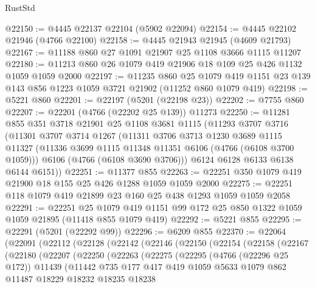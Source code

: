 \begin{lexlean}{RustStd}
\begin{coremodule}
{\begin{coremodule}
{{{{{{{{{{{{{{{{{{{{{{{{{{{{{{{{{{{@22150 := @4445 @22137 @22104 (@5902 @22094)
@22154 := @4445 @22102 @21946 (@4766 @22100)
@22158 := @4445 @21943 @21945 (@4609 @21793)
@22167 := @11188 @860 @27 @1091 @21907 @25 @1108 @3666 @1115 @11207
@22180 := @11213 @860 @26 @1079 @419 @21906 @18 @109 @25 @426 @1132 @1059 @1059 @2000
@22197 := @11235
    @860
    @25
    @1079
    @419
    @1151
    @23
    @139
    @143
    @856
    @1223
    @1059
    @3721
    @21902
    (@11252 @860 @1079 @419)
@22198 := @5221 @860
@22201 := @22197 (@5201 (@22198 @23))
@22202 := @7755 @860
@22207 := @22201 (@4766 (@22202 @25 @139)) @11273
@22250 := @11281
    @855
    @351
    @3718
    @21901
    @25
    @1108
    @3681
    @1115
    (@11293
      @3707
      @3716
      (@11301
        @3707
        @3714
        @1267
        (@11311
          @3706
          @3713
          @1230
          @3689
          @1115
          @11327
          (@11336 @3699 @1115 @11348 @11351 @6106 (@4766 (@6108 @3700 @1059)))
          @6106
          (@4766 (@6108 @3690 @3706)))
        @6124
        @6128
        @6133
        @6138
        @6144
        @6151))
@22251 := @11377 @855
@22263 := @22251 @350 @1079 @419 @21900 @18 @155 @25 @426 @1288 @1059 @1059 @2000
@22275 := @22251 @118 @1079 @419 @21899 @23 @160 @25 @438 @1293 @1059 @1059 @2058
@22291 := @22251
    @25
    @1079
    @419
    @1151
    @99
    @172
    @25
    @850
    @1322
    @1059
    @1059
    @21895
    (@11418 @855 @1079 @419)
@22292 := @5221 @855
@22295 := @22291 (@5201 (@22292 @99))
@22296 := @6209 @855
@22370 := @22064
    (@22091
      (@22112
        (@22128
          (@22142
            (@22146
              (@22150
                (@22154
                  (@22158
                    (@22167
                      (@22180
                        (@22207
                          (@22250
                            (@22263
                              (@22275
                                (@22295
                                  (@4766 (@22296 @25 @172))
                                  @11439
                                  (@11442
                                    @735
                                    @177
                                    @417
                                    @419
                                    @1059
                                    @5633
                                    @1079
                                    @862
                                    @11487
                                    @18229
                                    @18232
                                    @18235
                                    @18238
}}}}}}}}}}}}}}}}}}}}}}}}}}}}}}}}}}}
\end{coremodule}}
\end{coremodule}
\end{lexlean}
